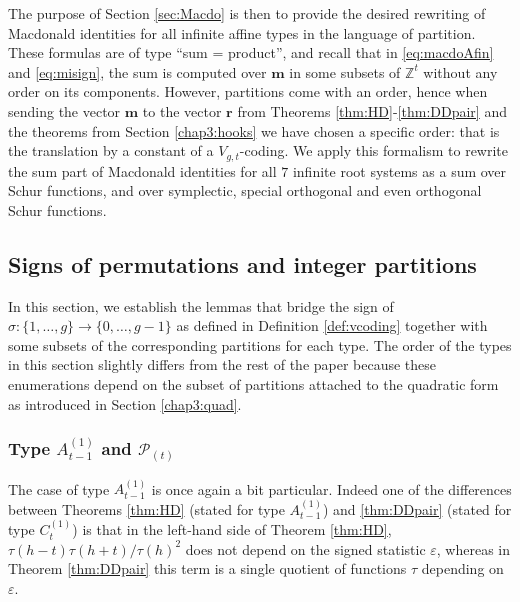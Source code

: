 \documentclass[11pt,letterpaper]{amsart}
\def\bbbz{\mathbb Z}
\def\ccp{\mathcal P}
\numberwithin{equation}{section}
\numberwithin{df}{section}
\begin{document}
The purpose of Section \ref{sec:Macdo} is then to provide the desired rewriting of Macdonald identities for all infinite affine types in the language of partition. These formulas are of type ``sum = product'', and recall that in \eqref{eq:macdoAfin} and \eqref{eq:misign}, the sum is computed over $\mathbf{m}$ in some subsets of $\bbbz^t$ without any order on its components. However, partitions come with an order, hence when sending the vector $\mathbf{m}$ to the vector $\mathbf{r}$ from Theorems \ref{thm:HD}-\ref{thm:DDpair} and the theorems from Section \ref{chap3:hooks} we have chosen a specific order: that is the translation by a constant of a $V_{g,t}$-coding. We apply this formalism to rewrite the sum part of Macdonald identities for all $7$ infinite root systems as a sum over Schur functions, and over symplectic, special orthogonal and even orthogonal Schur functions. 






\subsection{Signs of permutations and integer partitions}\label{chap4:sign}

In this section, we establish the lemmas that bridge the sign of $\sigma : \lbrace 1,\dots,g\rbrace\rightarrow \lbrace 0,\dots,g-1\rbrace $ as defined in Definition \ref{def:vcoding} together with some subsets of the corresponding partitions for each type. The order of the types in this section slightly differs from the rest of the paper because these enumerations depend on the subset of partitions attached to the quadratic form as introduced in Section \ref{chap3:quad}.


\subsubsection{Type $A^{(1)}_{t-1}$ and $\ccp_{(t)}$}

The case of type $A^{(1)}_{t-1}$ is once again a bit particular. Indeed one of the differences between Theorems \ref{thm:HD} (stated for type $A^{(1)}_{t-1}$) and \ref{thm:DDpair} (stated for type $C^{(1)}_{t}$) is that in the left-hand side of Theorem \ref{thm:HD}, $\tau(h-t)\tau(h+t)/\tau(h)^2$ does not depend on the signed statistic $\varepsilon$, whereas in Theorem \ref{thm:DDpair} this term is a single quotient of functions $\tau$ depending on $\varepsilon$. 
\end{document}
